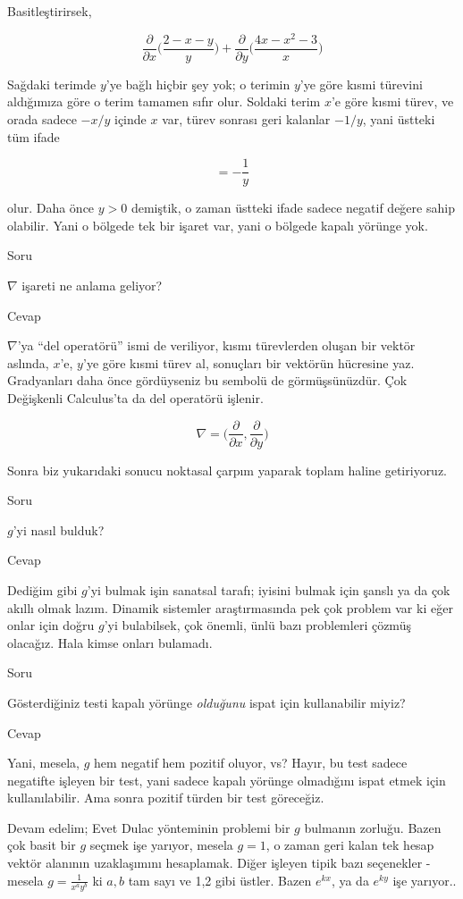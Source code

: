 \documentclass[12pt,fleqn]{article}\usepackage{../../common}
\begin{document}
Basitleştirirsek,

$$
\frac{\partial }{\partial x} \bigg( \frac{2 - x - y}{y} \bigg) + 
\frac{\partial }{\partial y} \bigg( \frac{4x - x^2 - 3}{x} \bigg)
$$

Sağdaki terimde $y$'ye bağlı hiçbir şey yok; o terimin $y$'ye göre kısmi
türevini aldığımıza göre o terim tamamen sıfır olur. Soldaki terim $x$'e göre
kısmi türev, ve orada sadece $-x/y$ içinde $x$ var, türev sonrası geri kalanlar
$-1/y$, yani üstteki tüm ifade

$$ = - \frac{1}{y} $$

olur. Daha önce $y > 0$ demiştik, o zaman üstteki ifade sadece negatif değere
sahip olabilir. Yani o bölgede tek bir işaret var, yani o bölgede kapalı yörünge
yok.

Soru

$\nabla$ işareti ne anlama geliyor?

Cevap

$\nabla$'ya ``del operatörü'' ismi de veriliyor, kısmı türevlerden oluşan bir
vektör aslında, $x$'e, $y$'ye göre kısmi türev al, sonuçları bir vektörün
hücresine yaz. Gradyanları daha önce gördüyseniz bu sembolü de
görmüşsünüzdür. Çok Değişkenli Calculus'ta da del operatörü işlenir. 

$$ \nabla =
\bigg(
\frac{\partial }{\partial x}, 
\frac{\partial }{\partial y}
\bigg) $$

Sonra biz yukarıdaki sonucu noktasal çarpım yaparak toplam haline getiriyoruz. 

Soru

$g$'yi nasıl bulduk?

Cevap

Dediğim gibi $g$'yi bulmak işin sanatsal tarafı; iyisini bulmak için şanslı
ya da çok akıllı olmak lazım. Dinamik sistemler araştırmasında pek çok
problem var ki eğer onlar için doğru $g$'yi bulabilsek, çok önemli, ünlü
bazı problemleri çözmüş olacağız. Hala kimse onları bulamadı.

Soru

Gösterdiğiniz testi kapalı yörünge {\em olduğunu} ispat için kullanabilir miyiz?

Cevap

Yani, mesela, $g$ hem negatif hem pozitif oluyor, vs? Hayır, bu test sadece
negatifte işleyen bir test, yani sadece kapalı yörünge olmadığını ispat etmek
için kullanılabilir. Ama sonra pozitif türden bir test göreceğiz.

Devam edelim; Evet Dulac yönteminin problemi bir $g$ bulmanın zorluğu. Bazen çok
basit bir $g$ seçmek işe yarıyor, mesela $g=1$, o zaman geri kalan tek hesap
vektör alanının uzaklaşımını hesaplamak. Diğer işleyen tipik bazı seçenekler -
mesela $g = \frac{1}{x^a y^b}$ ki $a,b$ tam sayı ve 1,2 gibi üstler. Bazen
$e^{kx}$, ya da $e^{ky}$ işe yarıyor..
\end{document}
